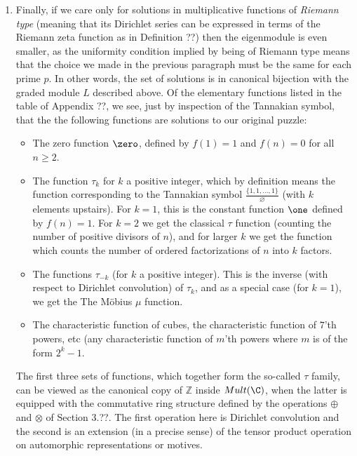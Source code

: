 \documentclass[a4paper]{article}
\begin{document}
\begin{example}
\begin{enumerate}
\item Finally, if we care only for solutions in multiplicative functions of \emph{Riemann type} (meaning that its Dirichlet series can be expressed in terms of the Riemann zeta function as in Definition ??) then the eigenmodule is even smaller, as the uniformity condition implied by being of Riemann type means that the choice we made in the previous paragraph must be the same for each prime $p$. In other words, the set of solutions is in canonical bijection with the graded module $L$ described above. Of the elementary functions listed in the table of Appendix ??, we see, just by inspection of the Tannakian symbol, that the the following functions are solutions to our original puzzle:
\begin{itemize}
\item The zero function $\zero$, defined by $f(1) = 1$ and $f(n) = 0$ for all $n \geq 2$. 
\item The function $\tau_k$ for $k$ a positive integer, which by definition means the function corresponding to the Tannakian symbol $\frac{ \{1, 1, \ldots, 1 \} }{ \varnothing  }$ (with $k$ elements upstairs). For $k=1$, this is the constant function $\one$ defined by $f(n) = 1$. For $k = 2$ we get the classical $\tau$ function (counting the number of positive divisors of $n$), and for larger $k$ we get the function which counts the number of ordered factorizations of $n$ into $k$ factors.
\item The functions $\tau_{-k}$ (for $k$ a positive integer). This is the inverse (with respect to Dirichlet convolution) of $\tau_k$, and as a special case (for $k=1$), we get the The M{\"o}bius $\mu$ function.
\item The characteristic function of cubes, the characteristic function of $7$'th powers, etc (any characteristic function of $m$'th powers where $m$ is of the form $2^k-1$. 
\end{itemize}

The first three sets of functions, which together form the so-called $\tau$ family, can be viewed as the canonical copy of $\mathbb{Z}$ inside $Mult(\C)$, when the latter is equipped with the commutative ring structure defined by the operations $\oplus$ and $\otimes$ of Section 3.??. The first operation here is Dirichlet convolution and the second is an extension (in a precise sense) of the tensor product operation on automorphic representations or motives.



\end{enumerate}


\end{example}
\end{document}
